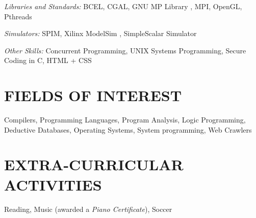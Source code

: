 \documentclass[margin]{res}
\begin{document}
\begin{resume}
        {\sl Libraries and Standards:}
        BCEL, CGAL, GNU MP Library , MPI, OpenGL, Pthreads

        {\sl Simulators:}
        SPIM, Xilinx ModelSim , SimpleScalar Simulator

        {\sl Other Skills:}
        Concurrent Programming, UNIX Systems Programming, Secure Coding in C, HTML + CSS

\section{FIELDS OF INTEREST} Compilers, Programming Languages, Program Analysis, Logic Programming, \\ 
Deductive Databases, Operating Systems, System programming, Web Crawlers

\section{EXTRA-CURRICULAR \\ ACTIVITIES}             
Reading, Music (awarded a {\it Piano Certificate}), Soccer

\end{resume}
\end{document}
